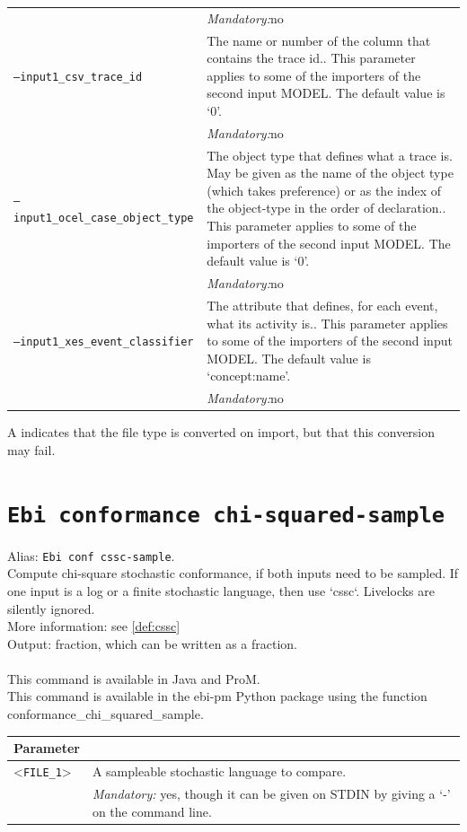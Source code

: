 {\begin{tabularx}{\linewidth}{lX}
&\textit{Mandatory:}\quad no\\
\texttt{--input1\_csv\_trace\_id} & The name or number of the column that contains the trace id.. This parameter applies to some of the importers of the second input MODEL. The default value is `0'.\\
&\textit{Mandatory:}\quad no\\
\texttt{--input1\_ocel\_case\_object\_type} & The object type that defines what a trace is. May be given as the name of the object type (which takes preference) or as the index of the object-type in the order of declaration.. This parameter applies to some of the importers of the second input MODEL. The default value is `0'.\\
&\textit{Mandatory:}\quad no\\
\texttt{--input1\_xes\_event\_classifier} & The attribute that defines, for each event, what its activity is.. This parameter applies to some of the importers of the second input MODEL. The default value is `concept:name'.\\
&\textit{Mandatory:}\quad no\\
\bottomrule
\end{tabularx}
A \textdagger{} indicates that the file type is converted on import, but that this conversion may fail.
\clearpage\section{\texttt{Ebi conformance chi-squared-sample}}
\label{command:Ebi conformance chi-squared-sample}
Alias: \texttt{Ebi conf cssc-sample}.\\
Compute chi-square stochastic conformance, if both inputs need to be sampled. 
        If one input is a log or a finite stochastic language, then use `cssc`.
        Livelocks are silently ignored.\\
More information: see \cref{def:cssc}~\\
\noindent Output: fraction, which can be written as a fraction.\\
\\This command is available in Java and ProM.
\\This command is available in the ebi-pm Python package using the function conformance\_chi\_squared\_sample.
\begin{tabularx}{\linewidth}{lX}
\toprule
Parameter \\\midrule
<\texttt{FILE\_1}>&A sampleable stochastic language to compare.\\
&\textit{Mandatory:} \quad yes, though it can be given on STDIN by giving a `-' on the command line.\\

\end{tabularx}}
